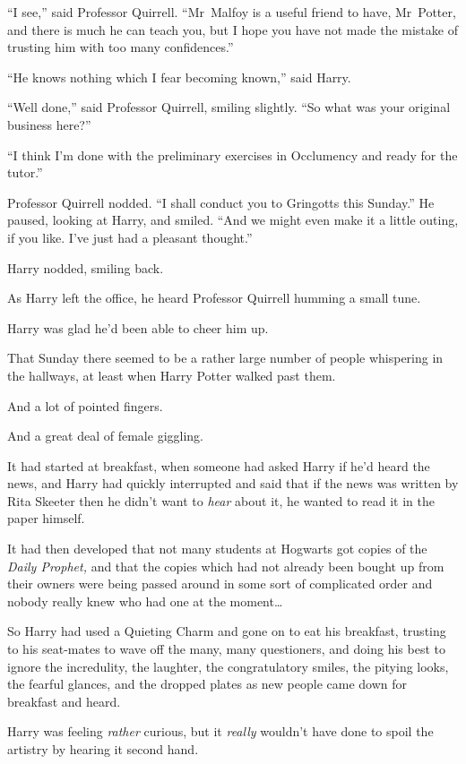 “I see,” said Professor Quirrell.
“Mr~Malfoy is a useful friend to have, Mr~Potter, and there is much he can teach you, but I hope you have not made the mistake of trusting him with too many confidences.”

“He knows nothing which I fear becoming known,” said Harry.

“Well done,” said Professor Quirrell, smiling slightly.
“So what was your original business here?”

“I think I’m done with the preliminary exercises in Occlumency and ready for the tutor.”

Professor Quirrell nodded.
“I shall conduct you to Gringotts this Sunday.” He paused, looking at Harry, and smiled.
“And we might even make it a little outing, if you like. I’ve just had a pleasant thought.”

Harry nodded, smiling back.

As Harry left the office, he heard Professor Quirrell humming a small tune.

Harry was glad he’d been able to cheer him up.

\later

That Sunday there seemed to be a rather large number of people whispering in the hallways, at least when Harry Potter walked past them.

And a lot of pointed fingers.

And a great deal of female giggling.

It had started at breakfast, when someone had asked Harry if he’d heard the news, and Harry had quickly interrupted and said that if the news was written by Rita Skeeter then he didn’t want to \emph{hear} about it, he wanted to read it in the paper himself.

It had then developed that not many students at Hogwarts got copies of the \emph{Daily Prophet,} and that the copies which had not already been bought up from their owners were being passed around in some sort of complicated order and nobody really knew who had one at the moment…

So Harry had used a Quieting Charm and gone on to eat his breakfast, trusting to his seat-mates to wave off the many, many questioners, and doing his best to ignore the incredulity, the laughter, the congratulatory smiles, the pitying looks, the fearful glances, and the dropped plates as new people came down for breakfast and heard.

Harry was feeling \emph{rather} curious, but it \emph{really} wouldn’t have done to spoil the artistry by hearing it second hand.

